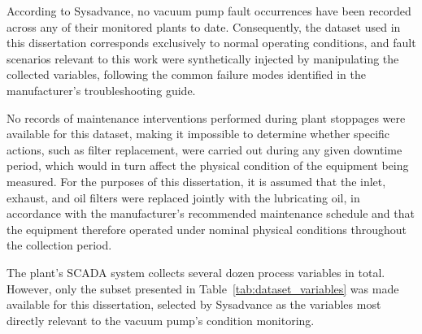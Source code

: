 According to Sysadvance, no vacuum pump fault occurrences have been recorded across any of their 
monitored plants to date. Consequently, the dataset used in this dissertation corresponds exclusively 
to normal operating conditions, and fault scenarios relevant to this work were synthetically injected by 
manipulating the collected variables, following the common failure modes identified in the 
manufacturer's troubleshooting guide.

No records of maintenance interventions performed during plant stoppages were available for this dataset, 
making it impossible to determine whether specific actions, such as filter replacement, were carried out 
during any given downtime period, which would in turn affect the physical condition of the equipment 
being measured. For the purposes of this dissertation, it is assumed that the inlet, exhaust, and oil 
filters were replaced jointly with the lubricating oil, in accordance with the manufacturer's recommended 
maintenance schedule and that the equipment therefore operated under 
nominal physical conditions throughout the collection period.

The plant's SCADA system collects several dozen process variables in total. However, only the subset 
presented in Table~\ref{tab:dataset_variables} was made available for this dissertation, selected by 
Sysadvance as the variables most directly relevant to the vacuum pump's condition monitoring.

